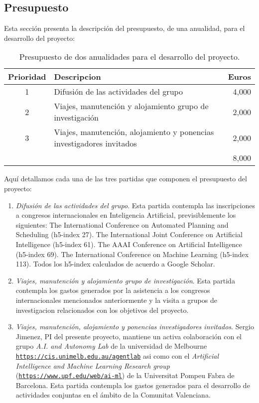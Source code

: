 \documentclass[10pt,a4paper]{paper}
\begin{document}
\subsection{Presupuesto} 
Esta sección presenta la descripción del presupuesto, de una anualidad, para el desarrollo del proyecto:

\begin{table}[hbt!]
\begin{small}  
  \begin{tabular}{cl|r}
    {\large\bf Prioridad} & {\large\bf Descripcion} & {\large\bf Euros} \\\hline
1 & {\scriptsize Difusión de las actividades del grupo}  & 4,000\\    
2 & {\scriptsize Viajes, manutención y alojamiento grupo de investigación} & 2,000\\
3 & {\scriptsize Viajes, manutención, alojamiento y ponencias investigadores invitados} & 2,000\\\hline
\multicolumn{2}{l|}{} & 8,000 \\
  \end{tabular}
\end{small}
\caption{\small Presupuesto de dos anualidades para el desarrollo del proyecto.}
\end{table}

Aquí detallamos cada una de las tres partidas que componen el presupuesto del proyecto:
\begin{enumerate}
\item {\em Difusión de las actividades del grupo}. Esta partida contempla las inscripciones a congresos internacionales en Inteligencia Artificial, previsiblemente los siguientes: The International Conference on Automated Planning and Scheduling (h5-index 27). The International Joint Conference on Artificial Intelligence (h5-index 61). The AAAI Conference on Artificial Intelligence (h5-index 69). The International Conference on Machine Learning (h5-index 113). Todos los h5-index calculados de acuerdo a Google Scholar.
\item {\em Viajes, manutención y alojamiento grupo de investigación}. Esta partida contempla los gastos generados por la asistencia a los congresos internacionales mencionados anteriormente y la visita a grupos de investigacion relacionados con los objetivos del proyecto.
\item {\em Viajes, manutención, alojamiento y ponencias investigadores invitados}. Sergio Jimenez, PI del presente proyecto, mantiene un activa colaboración con el grupo {\em A.I. and Autonomy Lab} de la universidad de Melbourne {\tt\small\url{https://cis.unimelb.edu.au/agentlab}} asi como con el {\em Artificial Intelligence and Machine Learning Research group} ({\tt\small\url{https://www.upf.edu/web/ai-ml}}) de la Universitat Pompeu Fabra de Barcelona.  Esta partida contempla los gastos generados para el desarrollo de actividades conjuntas en el ámbito de la Comunitat Valenciana. 
\end{enumerate}
\end{document}
